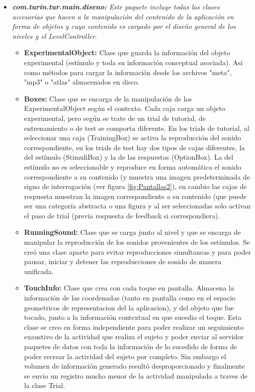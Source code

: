 \documentclass{article}
\numberwithin{figure}{section}
\begin{document}
\begin{itemize}
        \item \textit{\textbf{com.turin.tur.main.diseno:} Este paquete incluye todas las clases accesorias que hacen a la manipulación del contenido de la aplicación en forma de objetos y cuyo contenido es cargado por el diseño general de los niveles y el LevelController}.
        \begin{itemize}
            \item \textbf{ExperimentalObject:} Clase que guarda la información del objeto experimental (estímulo y toda su información conceptual asociada). Así como métodos para cargar la información desde los archivos "meta", "mp3" o "atlas" almacenados en disco. 
            \item \textbf{Boxes:} Clase que se encarga de la manipulación de los ExperimentalObject según el contexto. Cada caja carga un objeto experimental, pero según se trate de un trial de tutorial, de entrenamiento o de test se comporta diferente. En los trials de tutorial, al seleccionar una caja (TrainingBox) se activa la reproducción del sonido correspondiente, en los trials de test hay dos tipos de cajas diferentes, la del estímulo (StimuliBox) y la de las respuestas (OptionBox). La del estímulo no es seleccionable y reproduce en forma automática el sonido correspondiente a su contenido (y muestra una imagen predeterminada de signo de interrogación (ver figura \ref{fig:Pantallas2}), en cambio las cajas de respuesta muestran la imagen correspondiente a su contenido (que puede ser una categoría abstracta o una figura y al ser seleccionadas solo activan el paso de trial (previa respuesta de feedback si correspondiera).  
            \item \textbf{RunningSound:} Clase que se carga junto al nivel y que se encarga de manipular la reproducción de los sonidos provenientes de los estímulos. Se creó una clase aparte para evitar reproducciones simultaneas y para poder pausar, iniciar y detener las reproducciones de sonido de manera unificada. 
            \item \textbf{TouchInfo:} Clase que crea con cada toque en pantalla. Almacena la información de las coordenadas (tanto en pantalla como en el espacio geometricos de representacion del la aplicacion), y del objeto que fue tocado, junto a la información contextual en que sucedio el toque. Esta clase se creo en forma independiente para poder realizar un seguimiento exaustivo de la actividad que realiza el sujeto y poder enviar al servidor paquetes de datos con toda la información de lo sucedido de forma de poder recrear la actividad del sujeto por completo. Sin embargo el volumen de información generado resultó desproporcionado y finalmente se envio un registro mucho menor de la actividad manipulada a traves de la clase Trial.

\end{itemize}
\end{itemize}
\end{document}
